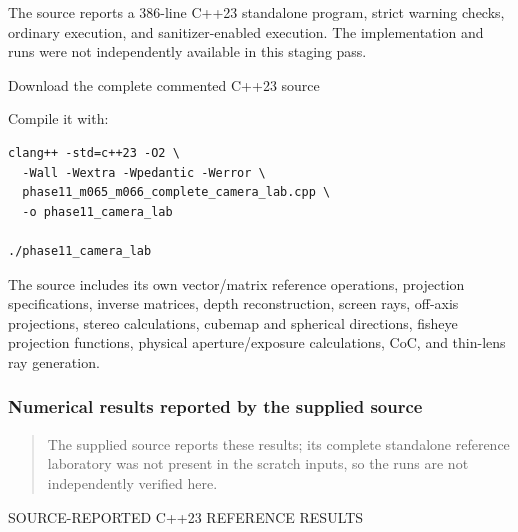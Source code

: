 The source reports a 386-line C++23 standalone program, strict warning checks, ordinary execution, and sanitizer-enabled execution. The implementation and runs were not independently available in this staging pass.

Download the complete commented C++23 source

Compile it with:

\begin{verbatim}
clang++ -std=c++23 -O2 \
  -Wall -Wextra -Wpedantic -Werror \
  phase11_m065_m066_complete_camera_lab.cpp \
  -o phase11_camera_lab

./phase11_camera_lab
\end{verbatim}

The source includes its own vector/matrix reference operations, projection specifications, inverse matrices, depth reconstruction, screen rays, off-axis projections, stereo calculations, cubemap and spherical directions, fisheye projection functions, physical aperture/exposure calculations, CoC, and thin-lens ray generation.

\subsubsection{Numerical results reported by the supplied source}\label{numerical-results-reported-by-the-supplied-source}

\begin{quote}
The supplied source reports these results; its complete standalone reference laboratory was not present in the scratch inputs, so the runs are not independently verified here.
\end{quote}

SOURCE-REPORTED C++23 REFERENCE RESULTS

